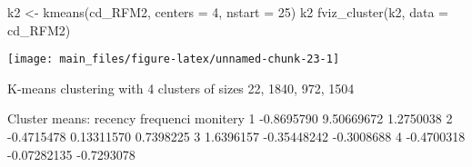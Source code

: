 \begin{Schunk}
\begin{Sinput}
k2 <- kmeans(cd_RFM2, centers = 4, nstart = 25)
k2
fviz_cluster(k2, data = cd_RFM2)
\end{Sinput}


\begin{center}\texttt{[image: main\_files/figure-latex/unnamed-chunk-23-1]} \end{center}

\begin{Soutput}
K-means clustering with 4 clusters of sizes 22, 1840, 972, 1504

Cluster means:
     recency   frequenci   monitery
1 -0.8695790  9.50669672  1.2750038
2 -0.4715478  0.13311570  0.7398225
3  1.6396157 -0.35448242 -0.3008688
4 -0.4700318 -0.07282135 -0.7293078


\end{Soutput}
\end{Schunk}
